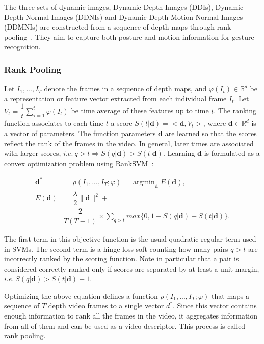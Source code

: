 \documentclass[10pt, a4paper, conference]{IEEEtran}
\begin{document}
The three sets of dynamic images, Dynamic Depth Images (DDIs), Dynamic Depth Normal Images (DDNIs) and Dynamic Depth Motion Normal Images (DDMNIs) are constructed from a sequence of depth maps through rank pooling~\cite{bilen2016dynamic}. They aim to capture both posture and motion information for gesture recognition.

\subsubsection{Rank Pooling}

Let $I_{1},...,I_{T}$ denote the frames in a sequence of depth maps, and $\varphi(I_{t}) \in \mathbb{R}^{d}$ be a representation or feature vector extracted from each individual frame $I_{t}$. Let $V_{t} = \dfrac{1}{t}\sum_{\tau=1}^{t}\varphi(I_{t})$ be time average of these features up to time $t$. The ranking function associates to each time $t$ a score $S(t|\textbf{d}) = <\textbf{d}, V_{t}>$, where $\textbf{d} \in \mathbb{R}^{d}$ is a vector of parameters. The function parameters $\textbf{d}$ are learned so that the scores reflect the rank of the frames in the video. In general, later times are associated with larger scores, $ i.e. ~q > t \Rightarrow S(q|\textbf{d}) > S(t|\textbf{d})$. Learning $\textbf{d}$ is formulated as a convex optimization problem using RankSVM~\cite{smola2004tutorial}:

\begin{equation}
\begin{aligned}
\textbf{d}^{*} &=\rho(I_{1},...,I_{T};\varphi) = \mathop{\arg\min}_{\textbf{d}} E(\textbf{d}),\\
  E(\textbf{d}) &= \dfrac{\lambda}{2}\parallel \textbf{d} \parallel^{2} +\\
  & \dfrac{2}{T(T-1)}\times\sum\limits_{q>t}max\{{0,1-S(q|\textbf{d}) + S(t|\textbf{d})}\}.
\end{aligned}
\end{equation}

The first term in this objective function is the usual quadratic regular term used in SVMs. The second term is a hinge-loss soft-counting how many pairs $q > t$ are incorrectly ranked by the scoring function. Note in particular that a pair is considered correctly ranked only if scores are separated by at least a unit margin, $i.e.~ S(q|\textbf{d}) > S(t|\textbf{d}) + 1$. 

Optimizing the above equation defines a function $\rho(I_{1},...,I_{T};\varphi)$ that maps a sequence of $T$ depth video frames to a single vector $d^{*}$. Since this vector contains enough information to rank all the frames in the video, it aggregates information from all of them and can be used as a video descriptor. This process is called rank pooling. 
\end{document}
